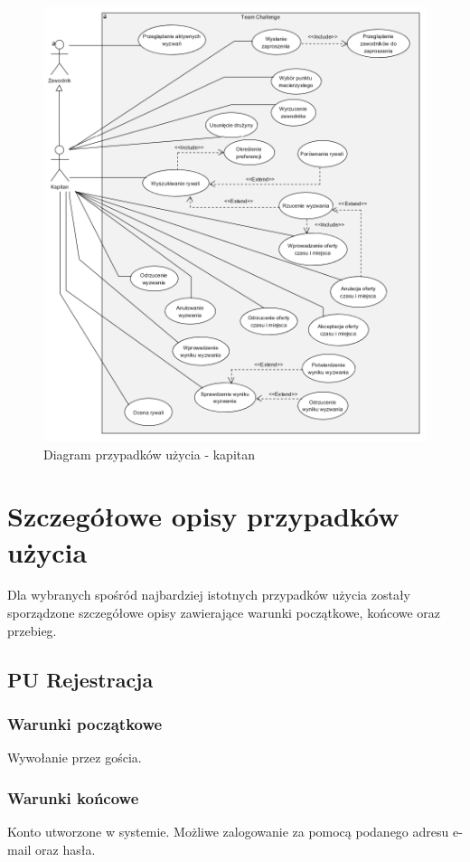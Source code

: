 \begin{figure}[H]
\centering
\includegraphics[width=\linewidth]{04-projekt/rys/usecase3.png}
\caption{Diagram przypadków użycia - kapitan}
\label{fig:diagram-uc-4}
\end{figure}

\section{Szczegółowe opisy przypadków użycia}

Dla wybranych spośród najbardziej istotnych przypadków użycia zostały sporządzone szczegółowe opisy zawierające warunki początkowe, końcowe oraz przebieg.

\subsection*{PU Rejestracja}
\subsubsection{Warunki początkowe}
Wywołanie przez gościa.
\subsubsection{Warunki końcowe}
Konto utworzone w systemie. Możliwe zalogowanie za pomocą podanego adresu e-mail oraz hasła.
